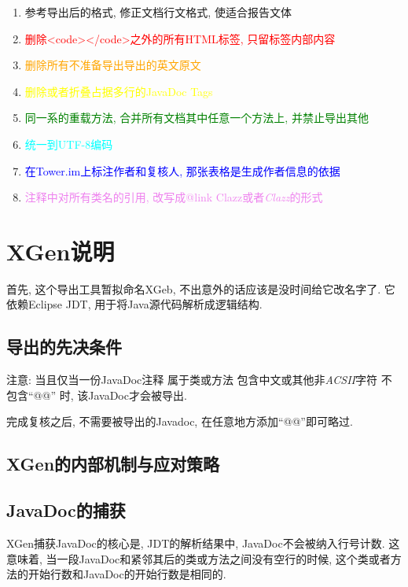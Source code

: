 \begin{centering}
    \begin{enumerate}
        \item 参考导出后的格式, 修正文档行文格式, 使适合报告文体
        \item \textcolor{red}{删除<code></code>之外的所有HTML标签, 只留标签内部内容}
        \item \textcolor{orange}{删除所有不准备导出导出的英文原文}
        \item \textcolor{yellow}{删除或者折叠占据多行的JavaDoc Tags}
        \item \textcolor{green}{同一系的重载方法, 合并所有文档其中任意一个方法上, 并禁止导出其他}
        \item \textcolor{cyan}{统一到UTF-8编码}
        \item \textcolor{blue}{在Tower.im上标注作者和复核人, 那张表格是生成作者信息的依据}
        \item \textcolor{violet}{注释中对所有类名的引用, 改写成{@link Clazz}或者\emph{Clazz}的形式}
    \end{enumerate}
\end{centering}

\chapter{XGen说明}

首先, 这个导出工具暂拟命名XGeb, 不出意外的话应该是没时间给它改名字了.
它依赖Eclipse JDT, 用于将Java源代码解析成逻辑结构.

\section{导出的先决条件}

注意: 当且仅当一份JavaDoc注释
属于类或方法
包含中文或其他非\emph{ACSII}字符
不包含``@@''
时, 该JavaDoc才会被导出.

完成复核之后, 不需要被导出的Javadoc, 在任意地方添加``@@''即可略过.

\section{XGen的内部机制与应对策略}

\section{JavaDoc的捕获}

XGen捕获JavaDoc的核心是, JDT的解析结果中, JavaDoc不会被纳入行号计数.
这意味着, 当一段JavaDoc和紧邻其后的类或方法之间没有空行的时候,
这个类或者方法的开始行数和JavaDoc的开始行数是相同的.

